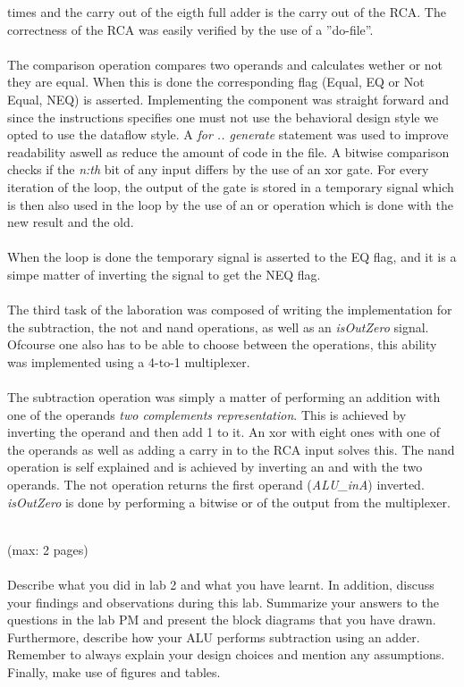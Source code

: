 \documentclass[a4paper,11pt]{article}
\begin{document}
times and the carry out of the eigth full adder is the carry out of the RCA. 
The correctness of the RCA was easily verified by the use of a ''do-file''.\\\\
\noindent
The comparison operation compares two operands and calculates wether or not 
they are equal. When this is done the corresponding flag (Equal, EQ or Not 
Equal, NEQ) is asserted. Implementing the component was straight forward and 
since the instructions specifies one must not use the behavioral design style 
we opted to use the dataflow style. A {\it for .. generate} statement was used 
to improve readability aswell as reduce the amount of code in the file. A 
bitwise comparison checks if the {\it n:th} bit of any input differs by the 
use of an xor gate. For every iteration of the loop, the output of the gate is 
stored in a temporary signal which is then also used in the loop by the use 
of an or operation which is done with the new result and the old.\\\\
\noindent
When the loop is done the temporary signal is asserted to the EQ flag, and it 
is a simpe matter of inverting the signal to get the NEQ flag.\\\\
\noindent
The third task of the laboration was composed of writing the implementation 
for the subtraction, the not and nand operations, as well as an {\it isOutZero} 
signal. Ofcourse one also has to be able to choose between the 
operations, this ability  was implemented using a 4-to-1 multiplexer.\\\\
\noindent
The subtraction operation was simply a matter of performing an addition with 
one of the operands {\it two complements representation}. This is achieved by 
inverting the operand and then add 1 to it. An xor with eight ones with one of 
the operands as well as adding a carry in to the RCA input solves this. The 
nand operation is self explained and is achieved by inverting an and with the 
two operands. The not operation returns the first operand ({\it ALU\_inA}) 
inverted. {\it isOutZero} is done by performing a bitwise or of the output 
from the multiplexer.\\\\
\noindent

(max: 2 pages)
\\\\
Describe what you did in lab 2 and what you have learnt. In addition, discuss your findings and observations during this lab. Summarize your answers to the questions in the lab PM and present the block diagrams that you have drawn. Furthermore, describe how your ALU performs subtraction using an adder. Remember to always explain your design choices and mention any assumptions. Finally, make use of figures and tables. 
\end{document}
